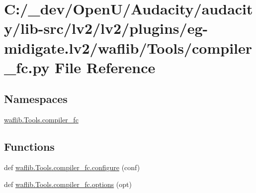 \hypertarget{lv2_2plugins_2eg-midigate_8lv2_2waflib_2_tools_2compiler__fc_8py}{}\section{C\+:/\+\_\+dev/\+Open\+U/\+Audacity/audacity/lib-\/src/lv2/lv2/plugins/eg-\/midigate.lv2/waflib/\+Tools/compiler\+\_\+fc.py File Reference}
\label{lv2_2plugins_2eg-midigate_8lv2_2waflib_2_tools_2compiler__fc_8py}
\subsection*{Namespaces}
\begin{DoxyCompactItemize}
\item 
 \hyperlink{namespacewaflib_1_1_tools_1_1compiler__fc}{waflib.\+Tools.\+compiler\+\_\+fc}
\end{DoxyCompactItemize}
\subsection*{Functions}
\begin{DoxyCompactItemize}
\item 
def \hyperlink{namespacewaflib_1_1_tools_1_1compiler__fc_afb0080302700edcb49f41f58f40aed12}{waflib.\+Tools.\+compiler\+\_\+fc.\+configure} (conf)
\item 
def \hyperlink{namespacewaflib_1_1_tools_1_1compiler__fc_ad760dedba1ba7a9aa7cfd119667484cd}{waflib.\+Tools.\+compiler\+\_\+fc.\+options} (opt)
\end{DoxyCompactItemize}
